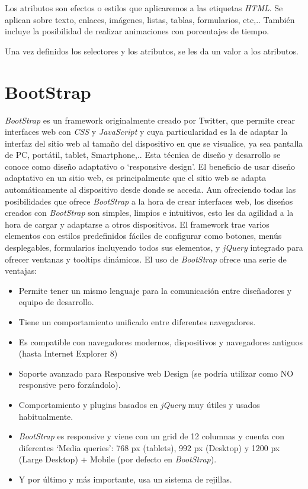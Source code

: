 \documentclass[a4paper, 12pt]{book}
\begin{document}
Los atributos son efectos o estilos que aplicaremos a las etiquetas \textit{HTML}. Se aplican sobre texto, enlaces, im\'agenes, listas, tablas, formularios, 
etc,.. Tambi\'en incluye la posibilidad de realizar animaciones con porcentajes de tiempo.

Una vez definidos los selectores y los atributos, se les da un valor a los atributos. 


\section{BootStrap}
\label{sec:bootstrap}
\textit{BootStrap} es un framework originalmente creado por Twitter, que permite crear interfaces web con \textit{CSS} y \textit{JavaScript} y cuya particularidad es la de adaptar 
la interfaz del sitio web al tama\~no del dispositivo en que se visualice, ya sea pantalla de PC, port\'atil, tablet, Smartphone,.. 
Esta t\'ecnica de dise\~no y desarrollo se conoce como dise\~no adaptativo o `responsive design'.
El beneficio de usar dise\'no adaptativo en un sitio web, es principalmente que el sitio web se adapta autom\'aticamente al dispositivo desde donde 
se acceda. Aun ofreciendo todas las posibilidades que ofrece \textit{BootStrap} a la hora de crear interfaces web, los dise\'nos creados con \textit{BootStrap} son 
simples, limpios e intuitivos, esto les da agilidad a la hora de cargar y adaptarse a otros dispositivos. El framework trae varios elementos con 
estilos predefinidos f\'aciles de configurar como botones, men\'us desplegables, formularios incluyendo todos sus elementos, y \textit{jQuery} integrado para 
ofrecer ventanas y tooltips din\'amicos.
El uso de \textit{BootStrap} ofrece una serie de ventajas:
\begin{itemize}
  \item Permite tener un mismo lenguaje para la comunicaci\'on entre dise\~nadores y equipo de desarrollo.
  \item Tiene un comportamiento unificado entre diferentes navegadores.
  \item Es compatible con navegadores modernos, dispositivos y navegadores antiguos (hasta Internet Explorer 8)
  \item Soporte avanzado para Responsive web Design (se podr\'ia utilizar como NO responsive pero forz\'andolo).
  \item Comportamiento y plugins basados en \textit{jQuery} muy \'utiles y usados habitualmente.
  \item \textit{BootStrap} es responsive y viene con un grid de 12 columnas y cuenta con diferentes `Media queries': 768 px (tablets), 992 px (Desktop) y 
  1200 px (Large Desktop) + Mobile (por defecto en \textit{BootStrap}).
  \item Y por \'ultimo y m\'as importante, usa un sistema de rejillas.
\end{itemize}
\end{document}
